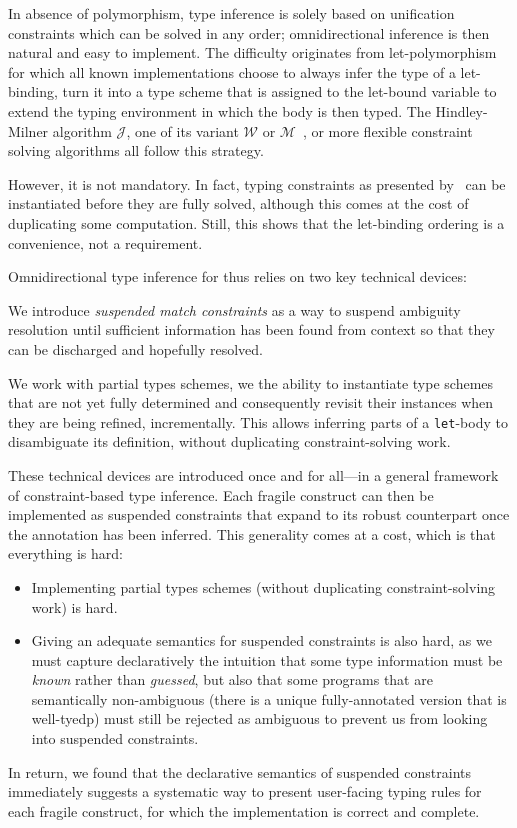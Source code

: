 \documentclass[acmsmall,screen,nonacm]{acmart}
\begin{document}
In absence of polymorphism, type inference is solely based on unification
constraints which can be solved in any order; omnidirectional inference is
then natural and easy to implement.  The difficulty originates from \ML
let-polymorphism for which all known implementations choose to always infer
the type of a let-binding, turn it into a type scheme that is assigned to
the let-bound variable to extend the typing environment in which the body is
then typed. The Hindley-Milner algorithm $\mathcal{J}$, one of its variant
$\mathcal{W}$ or $\mathcal{M}$~\cite {Lee_Yi/algoM@toplas1998}, or more
flexible constraint solving algorithms all follow this strategy.

However, it is not mandatory. In fact, typing constraints as presented
by~\citet {Pottier-Remy/emlti} can be instantiated before they are fully
solved, although this comes at the cost of duplicating some computation.
Still, this shows that the let-binding ordering is a convenience, not a
requirement.

Omnidirectional type inference for \ML thus relies on two key technical devices:
\begin{enumerate*}
\item
  We introduce \emph{suspended match constraints} as a way to suspend
  ambiguity resolution until sufficient information has been found from
  context so that they can be discharged and hopefully resolved.
\item
  We work with partial types schemes, \ie we the ability to instantiate type
  schemes that are not yet fully determined and consequently revisit their
  instances when they are being refined, incrementally. This allows
  inferring parts of a \texttt{let}-body to disambiguate its definition,
  without duplicating constraint-solving work.
\end{enumerate*}

These technical devices are introduced once and for all---in a general
framework of constraint-based type inference. Each fragile \ML construct can
then be implemented as suspended constraints that expand to its robust
counterpart once the annotation has been inferred. This generality comes at
a cost, which is that everything is hard:
\begin{itemize}
\item Implementing partial types schemes (without duplicating
  constraint-solving work) is hard.
\item Giving an adequate semantics for suspended constraints is also hard, as we
  must capture declaratively the intuition that some type information must be
  \emph{known} rather than \emph{guessed}, but also that some programs
  that are semantically non-ambiguous (there is a unique fully-annotated
  version that is well-tyedp) must still be rejected as ambiguous to prevent
  us from looking into suspended constraints.
\end{itemize}
In return, we found that the declarative semantics of suspended constraints
immediately suggests a systematic way to present user-facing typing rules
for each fragile construct, for which the implementation is correct and
complete.
\end{document}
